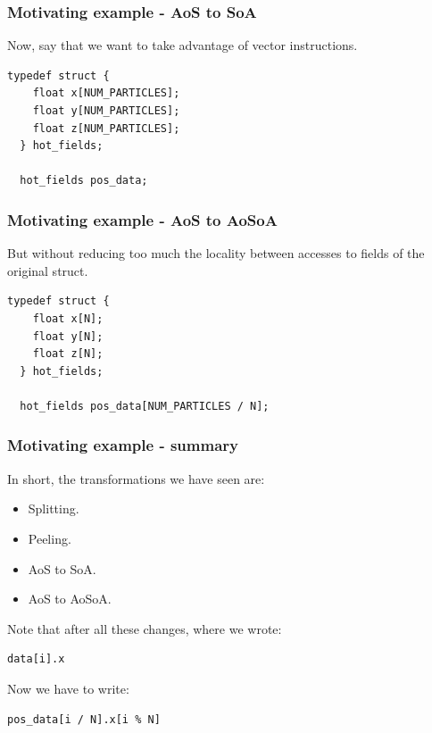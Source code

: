 \begin{frame}[fragile]
\frametitle{Motivating example - AoS to SoA}

Now, say that we want to take advantage of vector instructions.

\bigskip

\begin{lstlisting}[style=Cstyle]
  typedef struct {
    float x[NUM_PARTICLES]; 
    float y[NUM_PARTICLES];
    float z[NUM_PARTICLES];
  } hot_fields;

  hot_fields pos_data;
\end{lstlisting}

\end{frame}


\begin{frame}[fragile]
\frametitle{Motivating example - AoS to AoSoA}

But without reducing too much the locality between accesses to fields of the original struct.

\bigskip

\begin{lstlisting}[style=Cstyle]
  typedef struct {
    float x[N]; 
    float y[N];
    float z[N];
  } hot_fields;

  hot_fields pos_data[NUM_PARTICLES / N];
\end{lstlisting}

\end{frame}


\begin{frame}[fragile]
\frametitle{Motivating example - summary}

In short, the transformations we have seen are:
\begin{itemize}
	\item Splitting.
	\item Peeling.
	\item AoS to SoA.
	\item AoS to AoSoA.
\end{itemize}

\bigskip

Note that after all these changes, where we wrote:

\begin{lstlisting}[style=Cstyle]
  data[i].x 
\end{lstlisting}

Now we have to write:

\begin{lstlisting}[style=Cstyle]
  pos_data[i / N].x[i % N]
\end{lstlisting}

\end{frame}


